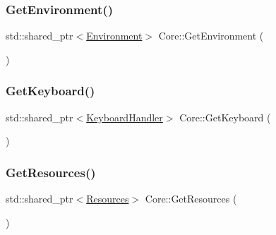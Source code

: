 \mbox{\label{class_core_a3a17d61ebebe3ebef9dc494f3112e3e7}} 
\subsubsection{\texorpdfstring{Get\+Environment()}{GetEnvironment()}}
{\footnotesize\ttfamily std\+::shared\+\_\+ptr$<$\mbox{\hyperlink{class_environment}{Environment}}$>$ Core\+::\+Get\+Environment (\begin{DoxyParamCaption}{ }\end{DoxyParamCaption})\hspace{0.3cm}{\ttfamily [inline]}}

\mbox{\label{class_core_a24a4ef158caf9f6a718dd0931e000e6c}} 
\subsubsection{\texorpdfstring{Get\+Keyboard()}{GetKeyboard()}}
{\footnotesize\ttfamily std\+::shared\+\_\+ptr$<$\mbox{\hyperlink{class_keyboard_handler}{Keyboard\+Handler}}$>$ Core\+::\+Get\+Keyboard (\begin{DoxyParamCaption}{ }\end{DoxyParamCaption})\hspace{0.3cm}{\ttfamily [inline]}}

\mbox{\label{class_core_acb593d32db59735a95768084eb4f0b19}} 
\subsubsection{\texorpdfstring{Get\+Resources()}{GetResources()}}
{\footnotesize\ttfamily std\+::shared\+\_\+ptr$<$\mbox{\hyperlink{class_resources}{Resources}}$>$ Core\+::\+Get\+Resources (\begin{DoxyParamCaption}{ }\end{DoxyParamCaption})\hspace{0.3cm}{\ttfamily [inline]}}

\mbox{\label{class_core_a76fb4db2f5c8214d1b021bc86b2c3b9c}} 
